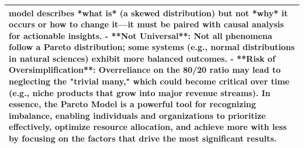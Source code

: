 \begin{longtable}[]{@{}l@{}}
model describes *what is* (a skewed distribution) but not *why* it
occurs or how to change it---it must be paired with causal analysis for
actionable insights. - **Not Universal**: Not all phenomena follow a
Pareto distribution; some systems (e.g., normal distributions in natural
sciences) exhibit more balanced outcomes. - **Risk of
Oversimplification**: Overreliance on the 80/20 ratio may lead to
neglecting the "trivial many," which could become critical over time
(e.g., niche products that grow into major revenue streams). In essence,
the Pareto Model is a powerful tool for recognizing imbalance, enabling
individuals and organizations to prioritize effectively, optimize
resource allocation, and achieve more with less by focusing on the
factors that drive the most significant results. \\
\bottomrule
\end{longtable}

